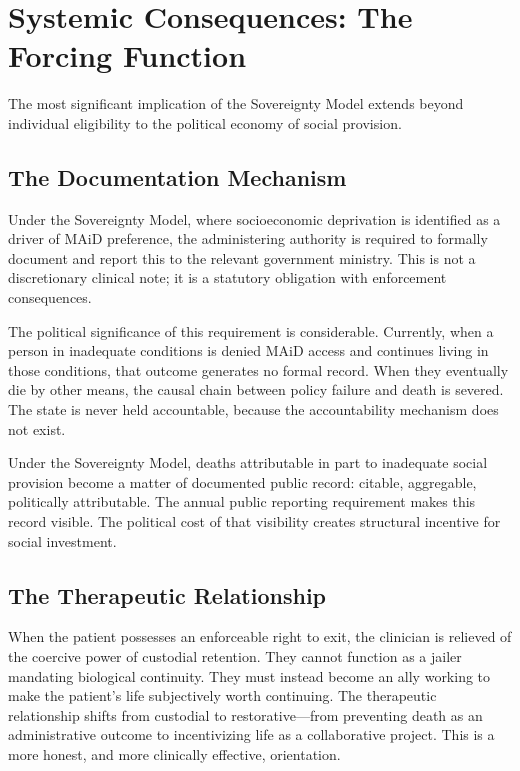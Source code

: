 \documentclass[11pt, letterpaper]{article}
\begin{document}
\section{Systemic Consequences: The Forcing Function}

The most significant implication of the Sovereignty Model extends beyond individual
eligibility to the political economy of social provision.

\subsection{The Documentation Mechanism}

Under the Sovereignty Model, where socioeconomic deprivation is identified as a
driver of MAiD preference, the administering authority is required to formally
document and report this to the relevant government ministry. This is not a
discretionary clinical note; it is a statutory obligation with enforcement
consequences.

The political significance of this requirement is considerable. Currently, when a
person in inadequate conditions is denied MAiD access and continues living in
those conditions, that outcome generates no formal record. When they eventually
die by other means, the causal chain between policy failure and death is severed.
The state is never held accountable, because the accountability mechanism does
not exist.

Under the Sovereignty Model, deaths attributable in part to inadequate social
provision become a matter of documented public record: citable, aggregable,
politically attributable. The annual public reporting requirement makes this record
visible. The political cost of that visibility creates structural incentive for
social investment.

\subsection{The Therapeutic Relationship}

When the patient possesses an enforceable right to exit, the clinician is
relieved of the coercive power of custodial retention. They cannot function as a
jailer mandating biological continuity. They must instead become an ally working
to make the patient's life subjectively worth continuing. The therapeutic
relationship shifts from custodial to restorative---from preventing death as
an administrative outcome to incentivizing life as a collaborative project. This
is a more honest, and more clinically effective, orientation.
\end{document}
